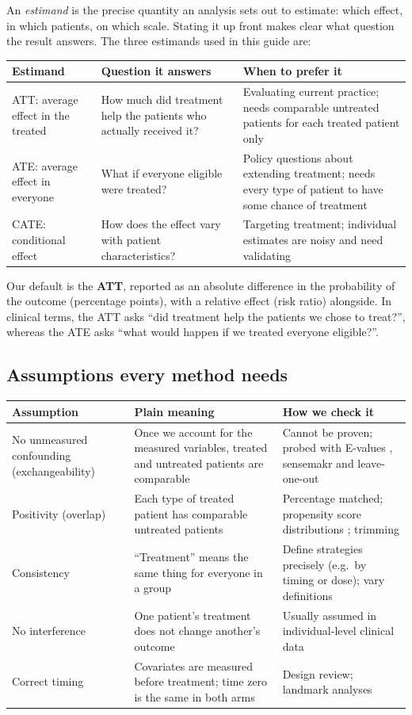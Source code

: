 An \emph{estimand} is the precise quantity an analysis sets out to estimate: which effect, in which patients, on which scale. Stating it up front makes clear what question the result answers. The three estimands used in this guide are:

\begin{xltabular}{\textwidth}{L{3.2cm}YY}
\toprule
\textbf{Estimand} & \textbf{Question it answers} & \textbf{When to prefer it} \\
\midrule
ATT: average effect in the treated & How much did treatment help the patients who actually received it? & Evaluating current practice; needs comparable untreated patients for each treated patient only \\
ATE: average effect in everyone & What if everyone eligible were treated? & Policy questions about extending treatment; needs every type of patient to have some chance of treatment \\
CATE: conditional effect & How does the effect vary with patient characteristics? & Targeting treatment; individual estimates are noisy and need validating \\
\bottomrule
\end{xltabular}

Our default is the \textbf{ATT}, reported as an absolute difference in the probability of the outcome (percentage points), with a relative effect (risk ratio) alongside. In clinical terms, the ATT asks ``did treatment help the patients we chose to treat?'', whereas the ATE asks ``what would happen if we treated everyone eligible?''.

\subsection{Assumptions every method needs}

\begin{xltabular}{\textwidth}{L{3.4cm}YY}
\toprule
\textbf{Assumption} & \textbf{Plain meaning} & \textbf{How we check it} \\
\midrule
No unmeasured confounding (exchangeability) & Once we account for the measured variables, treated and untreated patients are comparable & Cannot be proven; probed with E-values \cite{vanderweele2017evalue}, sensemakr \cite{cinelli2020} and leave-one-out \\
Positivity (overlap) & Each type of treated patient has comparable untreated patients & Percentage matched; propensity score distributions \cite{rosenbaum1983}; trimming \cite{crump2009} \\
Consistency & ``Treatment'' means the same thing for everyone in a group & Define strategies precisely (e.g.\ by timing or dose); vary definitions \\
No interference & One patient's treatment does not change another's outcome & Usually assumed in individual-level clinical data \\
Correct timing & Covariates are measured before treatment; time zero is the same in both arms & Design review; landmark analyses \cite{hernan2016immortal} \\
\bottomrule
\end{xltabular}

